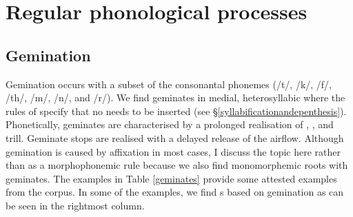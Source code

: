 
\section{Regular phonological processes} \label{regular-phon-processes}

\subsection{Gemination} \label{gemination-section}

Gemination occurs with a subset of the consonantal phonemes (/t/, /k/, /f/, /th/, /m/, /n/, and /r/). We find geminates in medial, heterosyllabic  where the rules of  specify that no  needs to be inserted (see \S{}\ref{syllabificationandepenthesis}). Phonetically, geminates are characterised by a prolonged realisation of , , and  trill. Geminate stops are realised with a delayed release of the airflow. Although gemination is caused by affixation in most cases, I discuss the topic here rather than as a morphophonemic rule because we also find monomorphemic roots with geminates. The examples in Table \ref{geminates} provide some attested examples from the corpus. In some of the examples, we find s based on gemination as can be seen in the rightmost column.


